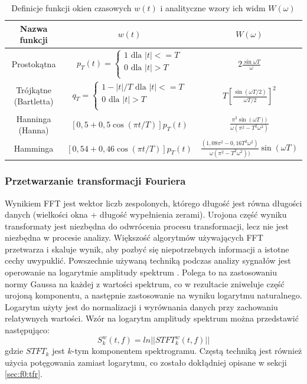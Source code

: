 \documentclass[12pt,a4paper,twoside]{mwart}
\begin{document}
\begin{table}[t]
  \begin{center}
    \begin{tabular}{ |c|c|c| } 
    \hline
    Nazwa funkcji & $w(t)$ & $W(\omega)$\\
    \hline
    Prostokątna & $p_T (t) = \left\{
      \begin{array}{ll}
        1 \text{ dla } |t| <= T\\
        0 \text{ dla } |t| > T\\
      \end{array}
    \right.  $ & $2\frac{\sin \omega T}{\omega}$\\
    \hline
    Trójkątne (Bartletta) & $q_T = \left\{
      \begin{array}{ll}
        1-|t|/T \text{ dla } |t| <= T\\
        0 \text{ dla } |t| > T\\
      \end{array}
    \right. $ & $T[\frac{\sin(\omega T / 2)}{\omega T/2}]^2$\\
    \hline
    Hanninga (Hanna) & $[0,5 + 0,5 \cos(\pi t / T)]p_T (t)$ & 
    $\frac{\pi^2 \sin(\omega T))}{\omega(\pi^2 - T^2 \omega^2)}$\\
    \hline
    Hamminga & $[0,54 + 0,46\cos(\pi t/T)]p_T (t)$ & 
    $\frac{(1,08\pi^2 - 0,16T^2\omega^2)}{\omega(\pi^2 - T^2 \omega^2))}\sin(\omega T)$\\
    \hline
    \end{tabular}
  \end{center}
  \caption{Definicje funkcji okien czasowych $w(t)$ i analityczne wzory ich widm $W(\omega)$}
  \label{tab:definicjeOkien}
\end{table}

\subsubsection{Przetwarzanie transformacji Fouriera}\label{sec:przetwarzanieFFT}
Wynikiem FFT jest wektor liczb zespolonych, którego długość jest równa długości danych (wielkości okna + długość wypełnienia zerami). Urojona część wyniku transformaty jest niezbędna do odwrócenia procesu transformacji, lecz nie jest niezbędna w procesie analizy. Większość algorytmów używających FFT przetwarza i skaluje wynik, aby pozbyć się niepotrzebnych informacji a istotne cechy uwypuklić. Powszechnie używaną techniką podczas analizy sygnałów jest operowanie na logarytmie amplitudy spektrum \cite[501-507]{Transcription:Talkin:RAPT}. Polega to na zastosowaniu normy Gaussa na każdej z wartości spektrum, co w rezultacie zniweluje część urojoną komponentu, a następnie zastosowanie na wyniku logarytmu naturalnego. Logarytm użyty jest do normalizacji i wyrównania danych przy zachowaniu relatywnych wartości. Wzór na logarytm amplitudy spektrum można przedstawić następująco:
\begin{equation}\label{eq:logPowSpec}
S_k^w(t,f) = ln||STFT_k^w(t,f)||
\end{equation}
gdzie $STFT_k$ jest $k$-tym komponentem spektrogramu. Częstą techniką jest również użycia potęgowania zamiast logarytmu, co zostało dokłądniej opisane w sekcji \ref{sec:f0:tfr}.
\end{document}

